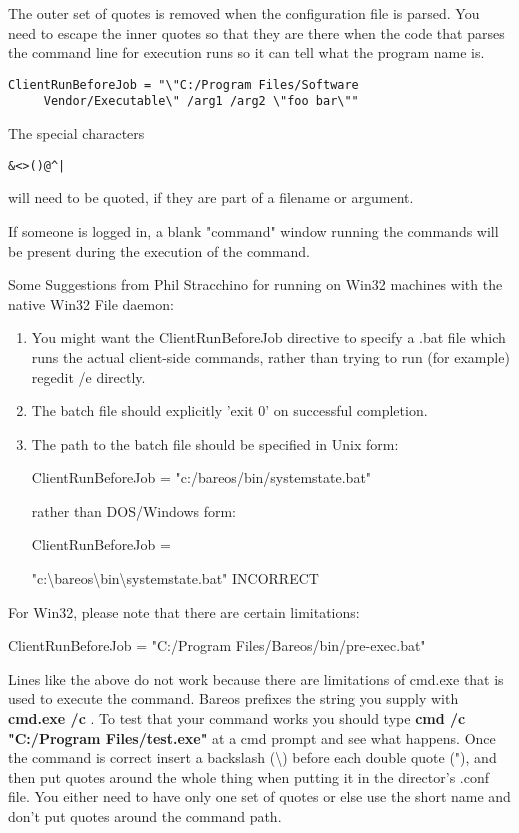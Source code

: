 \begin{description}
The outer set of quotes is removed when the configuration file is parsed.
You need to escape the inner quotes so that they are there when the code
that parses the command line for execution runs so it can tell what the
program name is.

\footnotesize
\begin{verbatim}
ClientRunBeforeJob = "\"C:/Program Files/Software
     Vendor/Executable\" /arg1 /arg2 \"foo bar\""
\end{verbatim}
\normalsize

The special characters
\begin{verbatim}
&<>()@^|
\end{verbatim}
will need to be quoted,
if they are part of a filename or argument.

If someone is logged in, a blank "command" window running the commands
will be present during the execution of the command.

Some Suggestions from Phil Stracchino for running on Win32 machines with
the native Win32 File daemon:

\begin{enumerate}
\item You might want the ClientRunBeforeJob directive to specify a .bat
      file which runs the actual client-side commands, rather than trying
      to run (for example) regedit /e directly.
\item The batch file should explicitly 'exit 0' on successful completion.
\item The path to the batch file should be specified in Unix form:

ClientRunBeforeJob = "c:/bareos/bin/systemstate.bat"

rather than DOS/Windows form:

ClientRunBeforeJob =

"c:\textbackslash{}bareos\textbackslash{}bin\textbackslash{}systemstate.bat"
   INCORRECT
   \end{enumerate}

For Win32, please note that there are certain limitations:

ClientRunBeforeJob = "C:/Program Files/Bareos/bin/pre-exec.bat"

Lines like the above do not work because there are limitations of
cmd.exe that is used to execute the command.
Bareos prefixes the string you supply with {\bf cmd.exe /c }.  To test that
your command works you should type {\bf cmd /c "C:/Program Files/test.exe"} at a
cmd prompt and see what happens.  Once the command is correct insert a
backslash (\textbackslash{}) before each double quote ("), and
then put quotes around the whole thing when putting it in
the director's .conf file.  You either need to have only one set of quotes
or else use the short name and don't put quotes around the command path.


\end{description}
